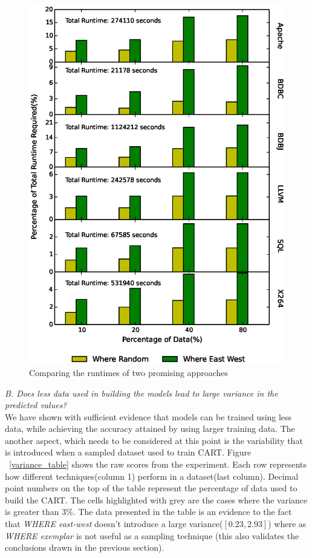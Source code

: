\documentclass{sig-alternative}
\begin{document}
    \begin{figure}[!t]
\includegraphics[width=0.9\linewidth]{Figures/sum_of_run_times_graph.eps}
\caption{ Comparing the runtimes of two promising approaches }\label{fig:Runtimes}
\end{figure}


\textit{B. Does less data used in building the models lead to large
variance in the predicted values?}\\

We have shown with sufficient evidence that models can be trained using less data, while achieving the accuracy
attained by using larger training data. 
The another aspect, which needs to be considered at this point is the variability that is introduced  when a sampled dataset used to train CART. 
Figure ~\ref{variance_table} shows the raw scores from the experiment. Each row represents how different techniques(column 1) perform in a dataset(last column). Decimal point numbers on the top of the table represent the percentage of data used to build the CART. The cells highlighted with grey are the cases where the variance is greater than 3\%. The data presented in the table is an evidence to the fact  that \textit{WHERE east-west} doesn't introduce a large variance($[0.23, 2.93]$) where as \textit{WHERE exemplar} is not useful as a sampling technique (this also validates the conclusions drawn in the previous section). 
\end{document}
